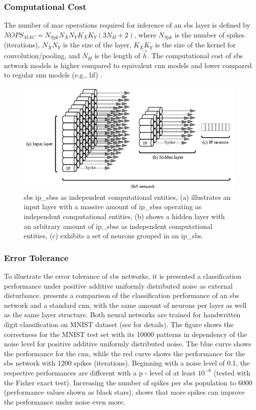 \subsubsection{Computational Cost}

The number of \gls{mac} operations required for inference of an \gls{sbs} layer is defined by $NOPS_{MAC}=N_{Spk} N_X N_Y K_X K_Y (3 N_H + 2)$, where $N_{Spk}$ is the number of spikes (iterations), $N_X N_Y$ is the size of the layer, $K_X K_Y$ is the size of the kernel for convolution/pooling, and $N_H$ is the length of $\vec{h}$. The computational cost of \gls{sbs} network models is higher compared to equivalent \gls{cnn} models and lower compared to regular \gls{snn} models (e.g., \gls{lif}) \mbox{\cite{izhikevich2004model}}.


\begin{figure}[b!]
	\centering
	\includegraphics[width=0.5\columnwidth]{./chapters/sbs_accelerator/figures/SbS_layer.pdf}
	\caption{\gls{sbs} \glspl{ip_sbs} as independent computational entities, (a) illustrates an input layer with a massive amount of \glspl{ip_sbs} operating as independent computational entities, (b) shows a hidden layer with an arbitrary amount of \glspl{ip_sbs} as independent computational entities, (c) exhibits a set of neurons grouped in an \gls{ip_sbs}.}
	\label{fig:SbS_layer}
\end{figure}


\subsubsection{Error Tolerance}

To illustrate the error tolerance of \gls{sbs} networks, it is presented a classification performance under positive additive uniformly distributed noise as external disturbance.  presents a comparison of the classification performance of an \gls{sbs} network and a standard \gls{cnn}, with the same amount of
neurons per layer as well as the same layer structure. Both neural networks are trained for handwritten digit classification on MNIST dataset \cite{lecun1998mnist} (see \cite{rotermund2019Backpropagation} for details). The figure shows the correctness for the MNIST test set with its \num[group-separator={,}]{10000} patterns in dependency of the noise level for positive additive
uniformly distributed noise. The blue curve shows the performance for
the \gls{cnn}, while the red curve shows the performance for
the \gls{sbs} network with \num[group-separator={,}]{1200} spikes (iterations). Beginning
with a noise level of 0.1, the respective performances are different
with a p - level of at least $10^{-6}$ (tested with the Fisher exact
test). Increasing the number of spikes per \gls{sbs} population to \num[group-separator={,}]{6000}
(performance values shown as black stars), shows that more spikes can
improve the performance under noise even more.

